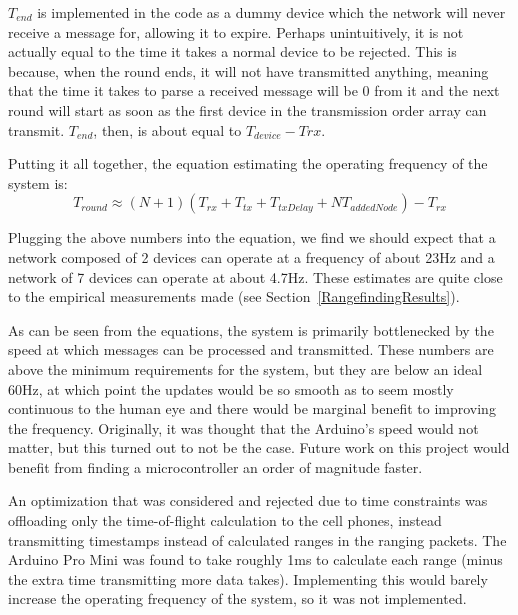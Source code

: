 $T_{end}$ is implemented in the code as a dummy device which the network will never receive a message for, allowing it to expire. Perhaps unintuitively, it is not actually equal to the time it takes a normal device to be rejected. This is because, when the round ends, it will not have transmitted anything, meaning that the time it takes to parse a received message will be 0 from it and the next round will start as soon as the first device in the transmission order array can transmit. $T_{end}$, then, is about equal to $T_{device} - T{rx}$.

Putting it all together, the equation estimating the operating frequency of the system is:
\[
	T_{round} \approx (N+1)(T_{rx} + T_{tx} + T_{txDelay} + NT_{addedNode}) - T_{rx}
\]

Plugging the above numbers into the equation, we find we should expect that a network composed of 2 devices can operate at a frequency of about 23Hz and a network of 7 devices can operate at about 4.7Hz. These estimates are quite close to the empirical measurements made (see Section~\ref{RangefindingResults}).

As can be seen from the equations, the system is primarily bottlenecked by the speed at which messages can be processed and transmitted. These numbers are above the minimum requirements for the system, but they are below an ideal 60Hz, at which point the updates would be so smooth as to seem mostly continuous to the human eye and there would be marginal benefit to improving the frequency. Originally, it was thought that the Arduino's speed would not matter, but this turned out to not be the case. Future work on this project would benefit from finding a microcontroller an order of magnitude faster. 

An optimization that was considered and rejected due to time constraints was offloading only the time-of-flight calculation to the cell phones, instead transmitting timestamps instead of calculated ranges in the ranging packets. The Arduino Pro Mini was found to take roughly 1ms to calculate each range (minus the extra time transmitting more data takes). Implementing this would barely increase the operating frequency of the system, so it was not implemented.